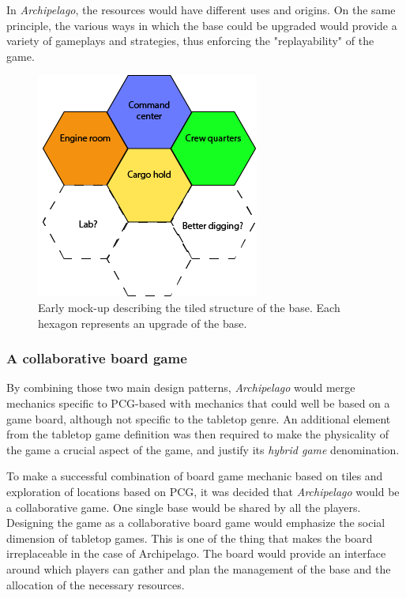In \textit{Archipelago}, the resources would have different uses and origins. On the same principle, the various ways in which the base could be upgraded would provide a variety of gameplays and strategies, thus enforcing the "replayability" of the game.

\begin{figure}[h]
    \centering
    \includegraphics[scale=0.5]{Images/Base.png}
    \caption{Early mock-up describing the tiled structure of the base. Each hexagon represents an upgrade of the base.}
    \label{fig:base}
\end{figure}
\subsubsection{A collaborative board game}
By combining those two main design patterns, \textit{Archipelago} would merge mechanics specific to PCG-based with mechanics that could well be based on a game board, although not specific to the tabletop genre. An additional element from the tabletop game definition was then required to make the physicality of the game a crucial aspect of the game, and justify its \textit{hybrid game} denomination.

To make a successful combination of board game mechanic based on tiles and exploration of locations based on PCG, it was decided that \textit{Archipelago} would be a collaborative game. One single base would be shared by all the players. Designing the game as a collaborative board game would emphasize the social dimension of tabletop games. This is one of the thing that makes the board irreplaceable in the case of Archipelago. The board would provide an interface around which players can gather and plan the management of the base and the allocation of the necessary resources.

